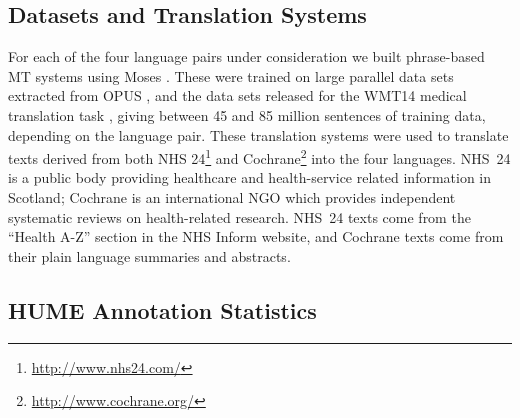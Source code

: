 \documentclass[11pt,letterpaper]{article}
\newcommand{\oa}[1]{\footnote{\color{red}OA: #1}}
\newcommand{\bh}[1]{\footnote{\color{blue}BH: #1}}
\def\parcite#1{\cite{#1}}
\begin{document}



\subsection{Datasets and Translation Systems}

For each of the four language pairs under consideration  we built phrase-based MT systems
using Moses \parcite{Koehn:2007}.  These were trained on large parallel data sets extracted from
OPUS \parcite{tiedemann:2009}, and the data sets released for the WMT14
medical translation task \parcite{bojar-EtAl:2014:W14-33}, 
giving between 45 and 85 million sentences of training data, depending on the language pair.
These translation systems were used to translate texts derived from both NHS
24\footnote{\url{http://www.nhs24.com/}} and
Cochrane\footnote{\url{http://www.cochrane.org/}} into the four languages.
NHS~24 is a public body providing healthcare and health-service
related information in Scotland; Cochrane is an international NGO
which provides independent systematic reviews on health-related research.
NHS~24 texts come from the ``Health A-Z'' section in the NHS Inform
website, and Cochrane texts come from their plain language summaries
and abstracts.


\subsection{HUME Annotation Statistics}
\label{sec:annot_stats}
\end{document}
